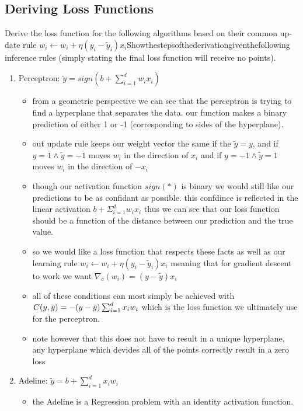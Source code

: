 \documentclass{article}
\begin{document}
\subsection{Deriving Loss Functions}
Derive the loss function for the following algorithms based on their common up- date rule $w_i \leftarrow w_i + \eta (y_i - \tilde{y}_i)x_i$Showthestepsofthederivationgiventhefollowing inference rules (simply stating the final loss function will receive no points).
\begin{enumerate}
    \item Perceptron: $\tilde{y}=sign(b+\sum_{i=1}^{d}w_ix_i)$
    \begin{itemize}
        \color{blue}
        \item from a geometric perspective we can see that the perceptron is trying to find a hyperplane that separates the data. our function makes a binary prediction of either 1 or -1 (corresponding to sides of the hyperplane).
        \item out update rule keeps our weight vector the same if the $\tilde{y}=y$, and if $y=1 \land \tilde{y}=-1$ moves $w_i$ in the direction of $x_i$ and if $y=-1 \land \tilde{y}=1$ moves $w_i$ in the direction of $-x_i$
        \item though our activation function $sign(*)$ is binary we would still like our predictions to be as confidant as possible. this confdince is reflected in the linear activation $b+\Sigma_{i=1}^{d}w_ix_i$
         thus we can see that our loss function should be a function of the distance between our prediction and the true value.
        \item so we would like a loss function that respects these facts as well as our learning rule  $w_i \leftarrow w_i + \eta (y_i - \tilde{y}_i)x_i$ meaning that for gradient descent to work we want $\nabla_c(w_i)= (y-\tilde{y})x_i$ 
        \item all of these conditions can most simply be achieved with $C(y,\tilde{y})=-(y-\Tilde{y})\sum_{i=1}^{d}x_iw_i$  which is the loss function we ultimately use for the perceptron.
        \item note however that this does not have to result in a unique hyperplane, any hyperplane which devides all of the points correctly result in a zero loss 
    \end{itemize}
    \item Adeline: $\tilde{y}=b+\sum_{i=1}^{d}x_iw_i$
    \begin{itemize}
        \color{blue}
        \item the Adeline is a Regression problem with an identity activation function.

\end{itemize}
\end{enumerate}
\end{document}
